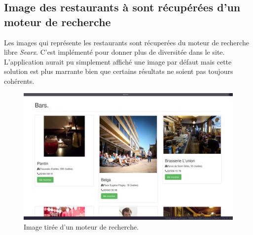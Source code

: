 \documentclass[a4paper,10pt]{article}
\begin{document}
\subsection{Image des restaurants à sont récupérées d'un moteur de recherche}
    Les images qui représente les restaurants sont récuperées du moteur de
    recherche libre \emph{Searx}. C'est implémenté pour donner plus de
    diversitée dans le site. L'application aurait pu simplement affiché une
    image par défaut mais cette solution est plus marrante bien que certains
    résultats ne soient pas toujours cohérents.

    \begin{figure}[h]
        \centering
        \includegraphics[scale=0.3]{./images/searx.png}
        \caption{Image tirée d'un moteur de recherche.}
    \end{figure}
\end{document}
